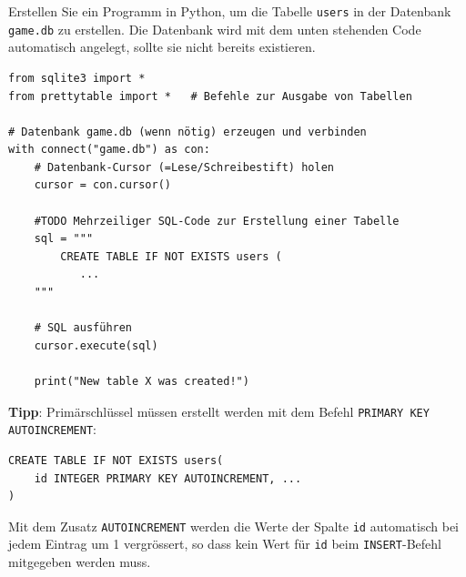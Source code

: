 \begin{myexercise}

    Erstellen Sie ein Programm in Python, um die Tabelle \texttt{users} in der Datenbank \texttt{game.db} zu erstellen. Die Datenbank wird mit dem unten stehenden Code automatisch angelegt, sollte sie nicht bereits existieren.

    \begin{lstlisting}
from sqlite3 import *
from prettytable import *   # Befehle zur Ausgabe von Tabellen

# Datenbank game.db (wenn nötig) erzeugen und verbinden
with connect("game.db") as con:
    # Datenbank-Cursor (=Lese/Schreibestift) holen
    cursor = con.cursor()

    #TODO Mehrzeiliger SQL-Code zur Erstellung einer Tabelle
    sql = """
        CREATE TABLE IF NOT EXISTS users (
           ...
    """

    # SQL ausführen
    cursor.execute(sql)

    print("New table X was created!")

\end{lstlisting}

    \textbf{Tipp}: Primärschlüssel müssen erstellt werden mit dem Befehl \lstinline[style=sql]|PRIMARY KEY AUTOINCREMENT|:
    \begin{lstlisting}[style=sql]
CREATE TABLE IF NOT EXISTS users(
	id INTEGER PRIMARY KEY AUTOINCREMENT, ...
)
\end{lstlisting}
    Mit dem Zusatz \lstinline[style=sql]|AUTOINCREMENT| werden die Werte der Spalte \texttt{id} automatisch bei jedem Eintrag um 1 vergrössert, so dass kein Wert für \texttt{id} beim \lstinline[style=sql]|INSERT|-Befehl mitgegeben werden muss.
    \begin{myanswer}
        
    \end{myanswer}
\end{myexercise}



